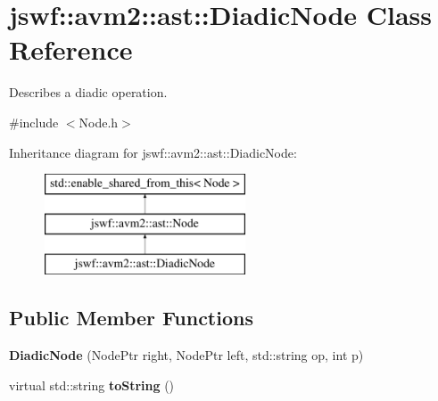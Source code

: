 \hypertarget{classjswf_1_1avm2_1_1ast_1_1_diadic_node}{\section{jswf\+:\+:avm2\+:\+:ast\+:\+:Diadic\+Node Class Reference}
\label{classjswf_1_1avm2_1_1ast_1_1_diadic_node}
}


Describes a diadic operation.  




{\ttfamily \#include $<$Node.\+h$>$}

Inheritance diagram for jswf\+:\+:avm2\+:\+:ast\+:\+:Diadic\+Node\+:\begin{figure}[H]
\begin{center}
\leavevmode
\includegraphics[height=3.000000cm]{classjswf_1_1avm2_1_1ast_1_1_diadic_node}
\end{center}
\end{figure}
\subsection*{Public Member Functions}
\begin{DoxyCompactItemize}
\item 
\hypertarget{classjswf_1_1avm2_1_1ast_1_1_diadic_node_a837163942ca9da3084897913fbc01b5d}{{\bfseries Diadic\+Node} (Node\+Ptr right, Node\+Ptr left, std\+::string op, int p)}\label{classjswf_1_1avm2_1_1ast_1_1_diadic_node_a837163942ca9da3084897913fbc01b5d}

\item 
\hypertarget{classjswf_1_1avm2_1_1ast_1_1_diadic_node_a2629df7becea46cb2ce5bad37d745b34}{virtual std\+::string {\bfseries to\+String} ()}\label{classjswf_1_1avm2_1_1ast_1_1_diadic_node_a2629df7becea46cb2ce5bad37d745b34}

\end{DoxyCompactItemize}
